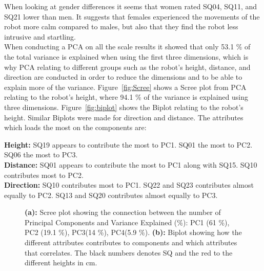 When looking at gender differences it seems that women rated SQ04, SQ11, and SQ21 lower than men. It suggests that females experienced the movements of the robot more calm compared to males, but also that they find the robot less intrusive and startling.\\
When conducting a PCA on all the scale results it showed that only 53.1 \% of the total variance is explained when using the first three dimensions, which is why PCA relating to different groups such as the robot's height, distance, and direction are conducted in order to reduce the dimensions and to be able to explain more of the variance. Figure~\ref{fig:Scree} shows a Scree plot from PCA relating to the robot's height, where 94.1 \% of the variance is explained using three dimensions. Figure~\ref{fig:biplot} shows the Biplot relating to the robot's height. Similar Biplots were made for direction and distance. The attributes which loads the most on the components are:

\noindent
\textbf{Height:} SQ19 appears to contribute the most to PC1. SQ01 the most to PC2. SQ06 the most to PC3. \\
\textbf{Distance:} SQ01 appears to contribute the most to PC1 along with SQ15. SQ10 contributes most to PC2.\\
\textbf{Direction:} SQ10 contributes most to PC1. SQ22 and SQ23 contributes almost equally to PC2. SQ13 and SQ20 contributes almost equally to PC3.\\
%
\begin{figure}[!t]
\centering
{}
\hfil
{}
\caption{\textbf{(a):} Scree plot showing the connection between the number of Principal Components and Variance Explained (\%): PC1 (61 \%), PC2 (19.1 \%), PC3(14 \%), PC4(5.9 \%). \textbf{(b):} Biplot showing how the different attributes contributes to components and which attributes that correlates. The black numbers denotes SQ and the red to the different heights in cm.}
\label{fig_sim}
\end{figure}





